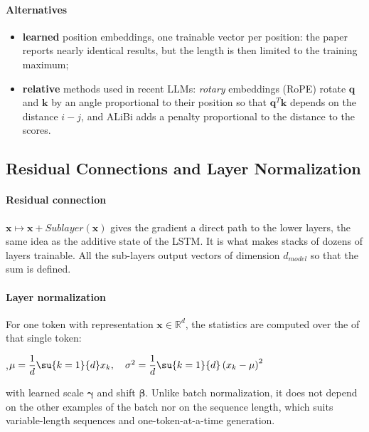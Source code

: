 \paragraph{Alternatives}
\begin{itemize}
    \item \textbf{learned} position embeddings, one trainable vector per position: the paper
        reports nearly identical results, but the length is then limited to the training
        maximum;
    \item \textbf{relative} methods used in recent LLMs: \emph{rotary} embeddings (RoPE)
        rotate $\bm{q}$ and $\bm{k}$ by an angle proportional to their position so that
        $\bm{q}^{T}\bm{k}$ depends on the distance $i-j$, and ALiBi adds a penalty
        proportional to the distance to the scores.
\end{itemize}

\subsection{Residual Connections and Layer Normalization}
\paragraph{Residual connection} $\bm{x}\mapsto\bm{x}+Sublayer(\bm{x})$ gives the gradient a
direct path to the lower layers, the same idea as the additive state of the LSTM. It is what
makes stacks of dozens of layers trainable. All the sub-layers output vectors of dimension
$d_{model}$ so that the sum is defined.

\paragraph{Layer normalization} For one token with representation $\bm{x}\in\mathbb{R}^{d}$,
the statistics are computed over the  of that single token:
\begin{center}
    ,\qquad $\mu=\dfrac{1}{d}\su{k=1}{d}x_{k},\quad
    \sigma^{2}=\dfrac{1}{d}\su{k=1}{d}\left(x_{k}-\mu\right)^{2}$
\end{center}
with learned scale $\bm{\gamma}$ and shift $\bm{\beta}$. Unlike batch normalization, it does
not depend on the other examples of the batch nor on the sequence length, which suits
variable-length sequences and one-token-at-a-time generation.

